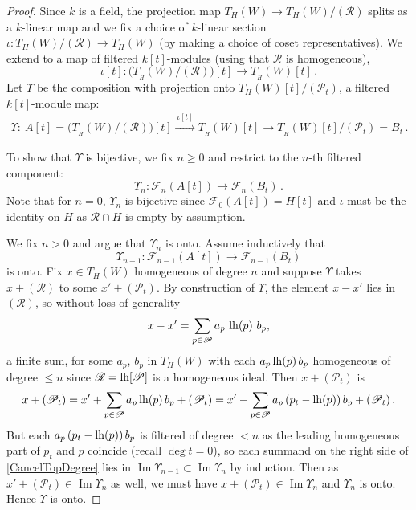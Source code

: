 \documentclass[11pt]{amsart}
\numberwithin{equation}{section}
\DeclareMathOperator{\ima}{Im}
\newcommand{\BBB}{B}
\newcommand{\sA}{A }
\newcommand{\RR}{\mathscr{R} }
\newcommand{\PP}{\mathscr{P}}
\newcommand{\LH}{{\rm{lh}}}
\renewcommand{\_}[1]{\mbox{$_{\left( #1 \right)}$}}
\newcommand{\F}{\mathcal F}
\begin{document}
{\begin{proof}
Since $k$ is a field, 
the projection map $T_{H}(W)\rightarrow 
    T_{H}(W)/(\RR)$ splits as a $k$-linear map 
    and we fix a choice of $k$-linear section
               $\iota:T_{H}(W)/(\RR)\rightarrow T_{H}(W)$
               (by making a choice of coset representatives).
We extend to a map  of filtered 
    $k[t]$-modules (using that $\RR$ is homogeneous),
    $$\iota[t]: \big(T_{\! _H}(W)/(\RR)\big)[t]
    \longrightarrow T_{\! _H}(W)[t]\, . $$  
    Let $\Upsilon$ be the composition with projection
    onto $T_{H}(W)[t]/(\PP_t)$, a filtered $k[t]$-module map:
$$
\begin{aligned}
  \Upsilon:\ \sA[t]=\big(T_{\! _H}(W)/ (\RR)\big)[t]
  \xrightarrow{ \  \iota [t]\ } 
  T_{\! _H}(W)[t]
  \longrightarrow
T_{\! _H}(W)[t]/(\PP_t)=\BBB_t 
\,  .
\end{aligned}
$$



To show that $\Upsilon$
is bijective, we 
fix $n\geq 0$
and restrict to the $n$-th filtered component:
$$
\Upsilon_n:  \F_n (\sA[t])
\longrightarrow 
\F_n(\BBB_t ) 
\,  . 
$$
Note that for $n=0$, $\Upsilon_n$ is bijective since
$\F_0(\sA[t])=H[t]$
and $\iota$ must be the identity on $H$ as $\RR\cap H$ is empty by assumption.

We fix $n>0$ and  argue that
$\Upsilon_n$ is onto.
Assume inductively that
$$\Upsilon_{n-1}: \F_{n-1}( \sA[t] ) \longrightarrow \F_{n-1}(\BBB_t)$$
is onto.
Fix $x\in T_{H}(W)$ homogeneous of degree $n$
and suppose
$\Upsilon$ takes $x+(\RR)$ to some $x'+(\PP_t)$.
By construction of $\Upsilon$, the element $x-x'$ lies in $(\RR)$, so
without loss of generality
 $$x-x'= \sum_{p\in \PP} a_p \ \LH(p)\ b_p,$$ 
 a finite sum, for some $a_p$, $b_p$ in $T_{H}(W)$
 with each $a_p \, \LH(p)\, b_p$  homogeneous of degree $\leq n$
since $\RR = \LH[\PP]$ is a homogeneous ideal.
%
Then $x + (\PP_t)$ is 
\begin{equation}\label{CancelTopDegree}
  \begin{aligned}
 x + (\PP_t)
=  x'+ \sum_{p\in \PP} a_p\, \LH(p) \, b_p + (\PP_t)
=
x'-\sum_{p\in \PP} a_p\,  (p_t-\LH(p) )\,  b_p
+ (\PP_t)
\, .
\end{aligned}
\end{equation}
But  each $a_p\, (p_t-\LH(p))\, b_p$ is filtered of degree $<n$
as the leading homogeneous part of $p_t$ and $p$ coincide
(recall $\deg t=0$),
so each
summand on the right side of \cref{CancelTopDegree}
lies in $\ima \Upsilon_{n-1}\subset \ima \Upsilon_{n}$ by induction.
Then as $x'+(\PP_t) \in\ima \Upsilon_n$ as well, we must have $x+(\PP_t)
\in\ima \Upsilon_n$
and
$\Upsilon_n$ is onto.
Hence $\Upsilon$ is onto.



\end{proof}}
\end{document}
